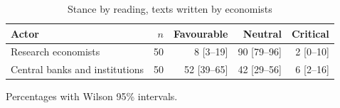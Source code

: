 \begin{table}[htbp]
\centering\small
\caption{Stance by reading, texts written by economists}\label{tab:stance}
\begin{tabular}{@{}lrrrr@{}}
\toprule
\textbf{Actor} & $n$ & \textbf{Favourable} & \textbf{Neutral} & \textbf{Critical} \\
\midrule
Research economists & 50 & 8 [3--19] & 90 [79--96] & 2 [0--10] \\
Central banks and institutions & 50 & 52 [39--65] & 42 [29--56] & 6 [2--16] \\
\bottomrule
\end{tabular}
\par\smallskip\parbox{0.92\linewidth}{\footnotesize Percentages with Wilson 95\% intervals.}
\end{table}

